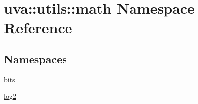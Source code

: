 \hypertarget{namespaceuva_1_1utils_1_1math}{}\section{uva\+:\+:utils\+:\+:math Namespace Reference}
\label{namespaceuva_1_1utils_1_1math}
\subsection*{Namespaces}
\begin{DoxyCompactItemize}
\item 
 \hyperlink{namespaceuva_1_1utils_1_1math_1_1bits}{bits}
\item 
 \hyperlink{namespaceuva_1_1utils_1_1math_1_1log2}{log2}
\end{DoxyCompactItemize}
